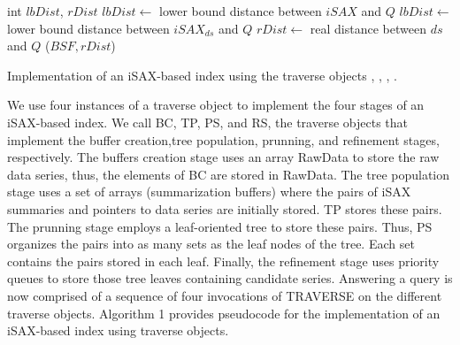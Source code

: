 \begin{algorithm}[htbp]
\begin{algorithmic}[1]
    \vspace*{1mm}
        \State int $\mathit{lbDist}$, $\mathit{rDist}$
        \State $\mathit{lbDist} \gets$ lower bound distance between $\mathit{iSAX}$ and $Q$
                \State $\mathit{lbDist} \gets$ lower bound distance between $\mathit{iSAX_{ds}}$ and $Q$
                    \State $\mathit{rDist} \gets$ real distance between $\mathit{ds}$ and $Q$
                        \State *\UpdateBSF($\mathit{BSF},\mathit{rDist}$) 
                    \EndIf
                \EndIf
            \EndFor
            \Return \True
        \Else
            \Return \False
        \EndIf
    \EndProcedure
    
    \end{algorithmic}
    
    \caption{Implementation of an iSAX-based index using the traverse objects \BC, \TP, \PS, \RS.}
    \label{alg:iSAXTraverse}
    \end{algorithm}
    
    

We use four instances of a traverse object to implement the four stages of an iSAX-based
index. We call BC, TP, PS, and RS, the traverse objects that implement the buffer 
creation,tree population, prunning, and refinement stages, respectively.
% 
The buffers creation stage uses an array RawData to store the raw data series, thus, the
elements of BC are stored in RawData. The tree population stage uses a set of arrays
(summarization buffers) where the pairs of iSAX summaries and pointers to data series
are initially stored. TP stores these pairs. The prunning stage employs a leaf-oriented
tree to store these pairs. Thus, PS organizes the pairs into as many sets as the leaf
nodes of the tree. Each set contains the pairs stored in each leaf. Finally, the
refinement stage uses priority queues to store those tree leaves containing candidate
series.
% 
Answering a query is now comprised of a sequence of four invocations of TRAVERSE on the
different traverse objects. Algorithm 1 provides pseudocode for the implementation of
an iSAX-based index using traverse objects.
 
